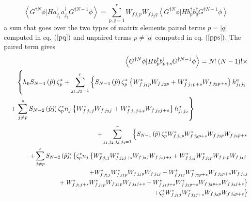 \documentclass{article}
\begin{document}
\begin{equation}
\left\langle G^{\dagger N}\phi |Ha_{j_{1}}^{\dagger }a_{j_{2}}^{\dagger
}G^{\dagger N-1}\phi \right\rangle
=\sum_{p,q=1}^{r}W_{f\,j_{1}p}W_{f\,j_{2}q}\left\langle G^{\dagger N}\phi
|Hb_{p}^{\dagger }b_{q}^{\dagger }G^{\dagger N-1}\phi \right\rangle
\label{ftrm}
\end{equation}%
a sum that goes over the two types of matrix elements paired terms $p=\left|
q\right| $ computed in eq. $\left( \ref{pq}\right) $ and unpaired terms $%
p\neq \left| q\right| $ computed in eq. $\left( \ref{pps}\right) $. The
paired term gives 
\begin{eqnarray}
&&\left\langle G^{\dagger N}\phi |Hb_{p}^{\dagger }b_{p+s}^{\dagger
}G^{\dagger N-1}\phi \right\rangle =N!\left( N-1\right) !\times  \notag \\
&&\left\{ h_{0}S_{N-1}\left( \hat{p}\right) \zeta _{p}^{\ast
}+\sum_{j_{1,}j_{2}=1}^{r}\left\{ \underset{}{\overset{}{}}S_{N-1}\left( 
\hat{p}\right) \zeta _{p}^{\ast }\left\{ W_{f\,j_{1}p}^{\ast
}W_{f\,j_{2}p}+W_{f\,j_{1}p+s}^{\ast }W_{f\,j_{2}p+s}\right\}
h_{j_{1}j_{2}}^{a}\right. \right.  \notag \\
&&+\left. \sum_{j\neq p}^{s}S_{N-2}\left( \hat{p}\hat{\jmath}\right) \zeta
_{p}^{\ast }n_{j}\left\{ W_{f\,j_{1}j}^{\ast
}W_{f\,j_{2}j}+W_{f\,j_{1}j+s}^{\ast }W_{f\,j_{2}j+s}\right\}
h_{j_{1}j_{2}}^{a}\right\} \qquad \qquad \qquad \qquad
\end{eqnarray}%
\begin{eqnarray}
&&+\sum_{j_{1,}j_{2,}j_{3,}j_{4}=1}^{r}\left\{ \underset{}{\overset{}{}}%
S_{N-1}\left( \hat{p}\right) \zeta _{p}^{\ast }W_{f\,j_{1}p}^{\ast
}W_{f\,j_{2}p+s}^{\ast }W_{f\,j_{3}p}W_{f\,j_{4}p+s}\right.  \notag \\
&&+\sum_{j\neq p}^{s}S_{N-2}\left( \hat{p}\hat{\jmath}\right) \left\{ \zeta
_{p}^{\ast }n_{j}\left\{ W_{f\,j_{1}j}^{\ast }W_{f\,j_{2}j+s}^{\ast
}W_{f\,j_{3}j}W_{f\,j_{4}j+s}+W_{f\,j_{1}j}^{\ast }W_{f\,j_{2}p}^{\ast
}W_{f\,j_{3}p}W_{f\,j_{4}j}\right. \right.  \notag \\
&&\qquad \qquad \qquad \qquad \qquad +W_{f\,j_{1}j}^{\ast
}W_{f\,j_{2}p}^{\ast }W_{f\,j_{3}p}W_{f\,j_{4}j}+W_{f\,j_{1}j}^{\ast
}W_{f\,j_{2}p+s}^{\ast }W_{f\,j_{3}p+s}W_{f\,j_{4}j}  \notag \\
&&\qquad \qquad \qquad \qquad +\left. W_{f\,j_{1}j+s}^{\ast
}W_{f\,j_{2}p}^{\ast }W_{f\,j_{3}p}W_{f\,j_{4}j+s}+W_{f\,j_{1}j+s}^{\ast
}W_{f\,j_{2}p+s}^{\ast }W_{f\,j_{3}p+s}W_{f\,j_{4}j+s}\right\}  \notag \\
&&\qquad \qquad \qquad \qquad \qquad \qquad \qquad \qquad \qquad \left.
+\zeta _{j}^{\ast }W_{f\,j_{1}j}^{\ast }W_{f\,j_{2}j+s}^{\ast
}W_{f\,j_{3}p}W_{f\,j_{4}p+s}\right\}
\end{eqnarray}%
\end{document}
